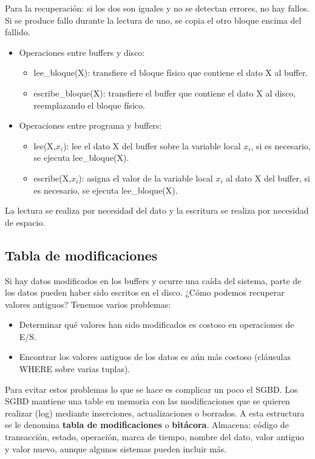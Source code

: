 Para la recuperación: si los dos son iguales y no se detectan errores, no hay fallos. Si se produce fallo durante la lectura de uno, se copia el otro bloque encima del fallido.

\begin{itemize}
\item Operaciones entre buffers y disco:
\begin{itemize}
\item lee\_bloque(X): transfiere el bloque físico que contiene el dato X al buffer.
\item escribe\_bloque(X): transfiere el buffer que contiene el dato X al disco, reemplazando el bloque físico.
\end{itemize}
\item Operaciones entre programa y buffers:
\begin{itemize}
\item lee(X,$x_i$): lee el dato X del buffer sobre la variable local $x_i$, si es necesario, se ejecuta lee\_bloque(X).
\item escribe(X,$x_i$): asigna el valor de la variable local $x_i$ al dato X del buffer, si es necesario, se ejecuta lee\_bloque(X).
\end{itemize}
\end{itemize}

La lectura se realiza por necesidad del dato y la escritura se realiza por necesidad de espacio. 

\subsection{Tabla de modificaciones}

Si hay datos modificados en los buffers y ocurre una caída del sistema, parte de los datos pueden haber sido escritos en el disco. ¿Cómo podemos recuperar valores antiguos? Tenemos varios problemas:
\begin{itemize}
\item Determinar qué valores han sido modificados es costoso en operaciones de E/S.
\item Encontrar los valores antiguos de los datos es aún más costoso (cláusulas WHERE sobre varias tuplas).
\end{itemize}

Para evitar estos problemas lo que se hace es complicar un poco el SGBD. Los SGBD mantiene una table en memoria con las modificaciones que se quieren realizar (log) mediante inserciones, actualizaciones o borrados. A esta estructura se le denomina \textbf{tabla de modificaciones} o \textbf{bitácora}. Almacena: código de transacción, estado, operación, marca de tiempo, nombre del dato, valor antiguo y valor nuevo, aunque algunos sistemas pueden incluir más.

